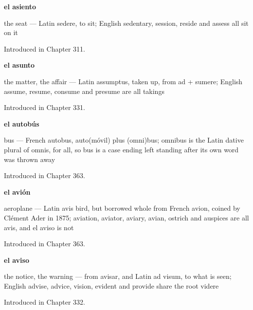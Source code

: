 \noindent\begin{minipage}[t]{\linewidth}
\raggedright
\textbf{el asiento}\par
\small the seat — Latin sedere, to sit; English sedentary, session, reside and assess all sit on it\par
\footnotesize Introduced in Chapter 311.
\end{minipage}\par\medskip

\noindent\begin{minipage}[t]{\linewidth}
\raggedright
\textbf{el asunto}\par
\small the matter, the affair — Latin assumptus, taken up, from ad + sumere; English assume, resume, consume and presume are all takings\par
\footnotesize Introduced in Chapter 331.
\end{minipage}\par\medskip

\noindent\begin{minipage}[t]{\linewidth}
\raggedright
\textbf{el autobús}\par
\small bus — French autobus, auto(móvil) plus (omni)bus; omnibus is the Latin dative plural of omnis, for all, so bus is a case ending left standing after its own word was thrown away\par
\footnotesize Introduced in Chapter 363.
\end{minipage}\par\medskip

\noindent\begin{minipage}[t]{\linewidth}
\raggedright
\textbf{el avión}\par
\small aeroplane — Latin avis bird, but borrowed whole from French avion, coined by Clément Ader in 1875; aviation, aviator, aviary, avian, ostrich and auspices are all avis, and el aviso is not\par
\footnotesize Introduced in Chapter 363.
\end{minipage}\par\medskip

\noindent\begin{minipage}[t]{\linewidth}
\raggedright
\textbf{el aviso}\par
\small the notice, the warning — from avisar, and Latin ad visum, to what is seen; English advise, advice, vision, evident and provide share the root videre\par
\footnotesize Introduced in Chapter 332.
\end{minipage}\par\medskip


